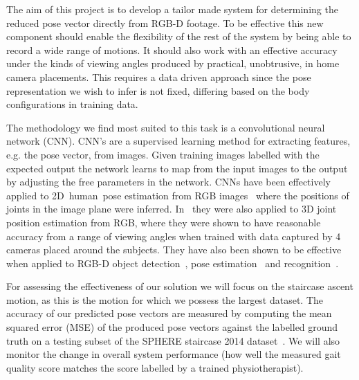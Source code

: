 \documentclass[11pt]{article} %
\begin{document}
The aim of this project is to develop a tailor made system for determining the reduced pose vector directly from RGB-D footage. To be effective this new component should enable the flexibility of the rest of the system by being able to record a wide range of motions. It should also work with an effective accuracy under the kinds of viewing angles produced by practical, unobtrusive, in home camera placements. This requires a data driven approach since the pose representation we wish to infer is not fixed, differing based on the body configurations in training data. %

The methodology we find most suited to this task is a convolutional neural network (CNN). CNN's are a supervised learning method for extracting features, e.g. the pose vector, from images. Given training images labelled with the expected output the network learns to map from the input images to the output by adjusting the free parameters in the network. CNNs have been effectively applied to 2D~human~pose estimation from RGB images~\cite{Toshev,Pfister,Li2014,Jain2013a,Jain2014,Tompson,Tompson2014} where the positions of joints in the image plane were inferred. In~\cite{Accv2014} they were also applied to 3D joint position estimation from RGB, where they were shown to have reasonable accuracy from a range of viewing angles when trained with data captured by 4 cameras placed around the subjects. They have also been shown to be effective when applied to RGB-D object detection~\cite{Gupta2014}, pose estimation~\cite{Schwarz2015} and recognition~\cite{Alexandre2013}. %

For assessing the effectiveness of our solution we will focus on the staircase ascent motion, as this is the motion for which we possess the largest dataset. The accuracy of our predicted pose vectors are measured by computing the mean squared error (MSE) of the produced pose vectors against the labelled ground truth on a testing subset of the SPHERE staircase 2014 dataset~\cite{Paiement}. We will also monitor the change in overall system performance (how well the measured gait quality score matches the score labelled by a trained physiotherapist). 



\end{document}

